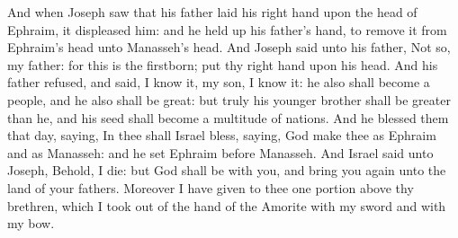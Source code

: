 \begin{biblechapter}
\verse And when Joseph saw that his father laid his right hand upon the head of Ephraim, it displeased him: and he held up his father's hand, to remove it from Ephraim's head unto Manasseh's head.
\verse And Joseph said unto his father, Not so, my father: for this is the firstborn; put thy right hand upon his head.
\verse And his father refused, and said, I know it, my son, I know it: he also shall become a people, and he also shall be great: but truly his younger brother shall be greater than he, and his seed shall become a multitude of nations.
\verse And he blessed them that day, saying, In thee shall Israel bless, saying, God make thee as Ephraim and as Manasseh: and he set Ephraim before Manasseh.
\verse And Israel said unto Joseph, Behold, I die: but God shall be with you, and bring you again unto the land of your fathers.
\verse Moreover I have given to thee one portion above thy brethren, which I took out of the hand of the Amorite with my sword and with my bow.
\end{biblechapter}

